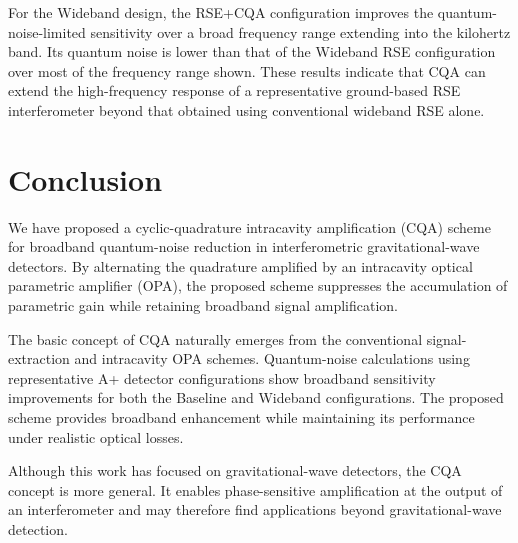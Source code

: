 \documentclass{iopjournal}
\begin{document}
For the Wideband design, the RSE+CQA configuration improves the quantum-noise-limited sensitivity over a broad frequency range extending into the kilohertz band. Its quantum noise is lower than that of the Wideband RSE configuration over most of the frequency range shown. These results indicate that CQA can extend the high-frequency response of a representative ground-based RSE interferometer beyond that obtained using conventional wideband RSE alone.
\section{Conclusion}
\label{sec:conclusion}
We have proposed a cyclic-quadrature intracavity amplification (CQA) scheme for broadband quantum-noise reduction in interferometric gravitational-wave detectors. By alternating the quadrature amplified by an intracavity optical parametric amplifier (OPA), the proposed scheme suppresses the accumulation of parametric gain while retaining broadband signal amplification.

The basic concept of CQA naturally emerges from the conventional signal-extraction and intracavity OPA schemes. Quantum-noise calculations using representative A+ detector configurations show broadband sensitivity improvements for both the Baseline and Wideband configurations. The proposed scheme provides broadband enhancement while maintaining its performance under realistic optical losses.

Although this work has focused on gravitational-wave detectors, the CQA concept is more general. It enables phase-sensitive amplification at the output of an interferometer and may therefore find applications beyond gravitational-wave detection.



\end{document}
